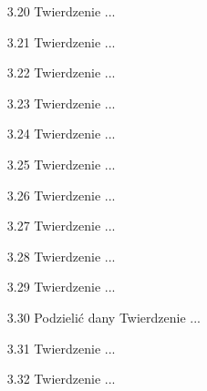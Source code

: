 \begin{enumerate}
    \item [3.20] Twierdzenie ...
    \item [3.21] Twierdzenie ...
    \item [3.22] Twierdzenie ...
    \item [3.23] Twierdzenie ...
    \item [3.24] Twierdzenie ...
    \item [3.25] Twierdzenie ...
    \item [3.26] Twierdzenie ...
    \item [3.27] Twierdzenie ...
    \item [3.28] Twierdzenie ...
    \item [3.29] Twierdzenie ...
    \item [3.30] Podzielić dany Twierdzenie ...
    \item [3.31] Twierdzenie ...
    \item [3.32] Twierdzenie ...

\end{enumerate}

